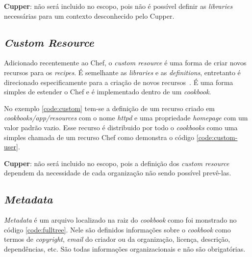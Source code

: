\textbf{Cupper}: não será incluido no escopo, pois não é possível definir as \textit{libraries}
necessárias para um contexto desconhecido pelo Cupper.

\subsection{\textit{Custom Resource}}
\label{sec:lev-rec-cust}

Adicionado recentemente ao Chef, o \textit{custom resource} é uma forma de criar
novos recursos para os \textit{recipes}. É semelhante as \textit{libraries} e as \textit{definitions},
entretanto é direcionado especificamente para a criação de novos recursos~\cite{chefdoc:2016}.
É uma forma simples de estender o Chef e é implementado dentro de um
\textit{cookbook}.

No exemplo \ref{code:custom} tem-se a definição de um recurso criado em \textit{cookbooks/app/resources}
com o nome \textit{httpd} e uma propriedade \textit{homepage} com um valor padrão vazio.
Esse recurso é distribuido por todo o \textit{cookbooks} como uma simples chamada
de um recurso Chef como demonstra o código \ref{code:custom-user}.

\noindent\begin{minipage}{.45\textwidth}
  \lstset{style=shell}
  
\end{minipage}\hfill
\begin{minipage}{.45\textwidth}
  \lstset{style=shell}
  
\end{minipage}

\textbf{Cupper}: não será incluido no escopo, pois a definição dos \textit{custom resource} dependem
da necessidade de cada organização não sendo possível prevê-las.

\subsection{\textit{Metadata}}
\label{sec:cbmetadata}

\textit{Metadata} é um arquivo localizado na raiz do \textit{cookbook} como foi monstrado no código
\ref{code:fulltree}. Nele são definidos informações sobre o \textit{cookbook} como termos de \textit{copyright},
\textit{email} do criador ou da organização, licença, descrição, dependências, etc. São 
todas informações organizacionais e não são obrigatórias.

